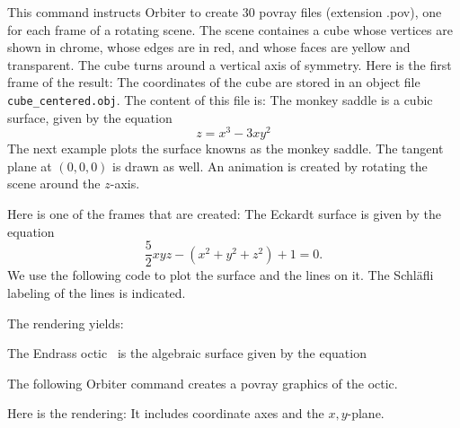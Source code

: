
This command instructs Orbiter to create 30 povray files (extension .pov), 
one for each frame of a rotating scene. 
The scene containes a cube whose vertices are shown in chrome, 
whose edges are in red, and whose faces are yellow and transparent. 
The cube turns around a vertical axis of symmetry.
Here is the first frame of the result:
The coordinates of the cube are stored in an object file \verb'cube_centered.obj'.
The content of this file is:
The monkey saddle is a cubic surface, given by the equation 
$$
z = x^3-3xy^2
$$
The next example plots the surface knowns as the monkey saddle. 
The tangent plane at $(0,0,0)$ is drawn as well. 
An animation is created by rotating the scene around the $z$-axis.




Here is one of the frames that are created:
The Eckardt surface is given by the equation
$$
\frac{5}{2}xyz-(x^2+y^2+z^2)+1=0.
$$
We use the following code to plot the surface and the lines on it. 
The Schl\"afli labeling of the lines is indicated.


The rendering yields:






\bigskip

The Endrass octic~\cite{Endrass97} is the algebraic surface given by the equation



The following Orbiter command creates a povray graphics of the octic. 




Here is the rendering:
It includes coordinate axes and the $x,y$-plane. 

\bigskip

